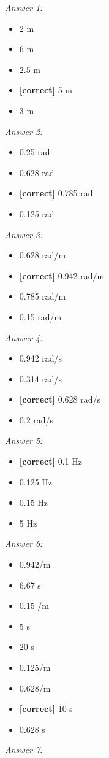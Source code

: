 \documentclass[11pt]{article}
\begin{document}
\begin{enumerate}[leftmargin=*,label=\textbf{Question \arabic*.}]
\textit{Answer 1:}
\begin{itemize}
  \item 2 m
  \item 6 m
  \item 2.5 m
  \item \textbf{[correct]} 5 m
  \item 3 m
\end{itemize}
\textit{Answer 2:}
\begin{itemize}
  \item 0.25 rad
  \item 0.628 rad
  \item \textbf{[correct]} 0.785 rad
  \item 0.125 rad
\end{itemize}
\textit{Answer 3:}
\begin{itemize}
  \item 0.628 rad/m
  \item \textbf{[correct]} 0.942 rad/m
  \item 0.785 rad/m
  \item 0.15 rad/m
\end{itemize}
\textit{Answer 4:}
\begin{itemize}
  \item 0.942 rad/s
  \item 0.314 rad/s
  \item \textbf{[correct]} 0.628 rad/s
  \item 0.2 rad/s
\end{itemize}
\textit{Answer 5:}
\begin{itemize}
  \item \textbf{[correct]} 0.1 Hz
  \item 0.125 Hz
  \item 0.15 Hz
  \item 5 Hz
\end{itemize}
\textit{Answer 6:}
\begin{itemize}
  \item 0.942/m
  \item 6.67 s
  \item 0.15 /m
  \item 5 s
  \item 20 s
  \item 0.125/m
  \item 0.628/m
  \item \textbf{[correct]} 10 s
  \item 0.628 s
\end{itemize}
\textit{Answer 7:}
\begin{itemize}

\end{itemize}
\end{enumerate}
\end{document}
